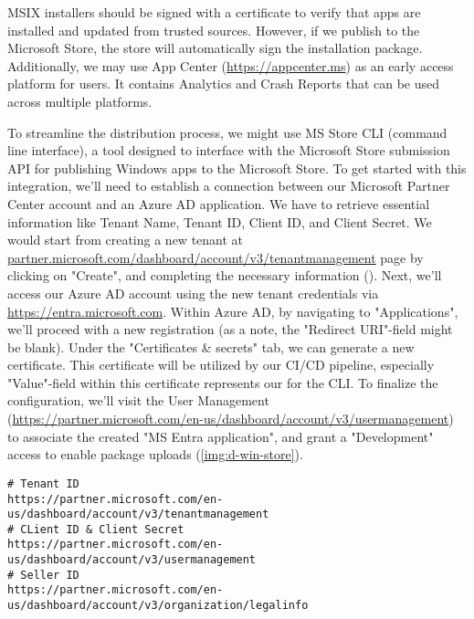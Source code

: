 \noindent MSIX installers should be signed with a certificate to verify that apps are installed and updated from trusted 
sources. However, if we publish to the Microsoft Store, the store will automatically sign the installation package. 
Additionally, we may use App Center (\href{https://appcenter.ms}{https://appcenter.ms}) as an early access platform for 
users. It contains Analytics and Crash Reports that can be used across multiple platforms.

To streamline the distribution process, we might use MS Store CLI (command line interface), a tool designed to 
interface with the Microsoft Store submission API for publishing Windows apps to the Microsoft Store. To get started 
with this integration, we'll need to establish a connection between our Microsoft Partner Center account and an Azure 
AD application. We have to retrieve essential information like Tenant Name, Tenant ID, Client ID, and Client Secret. 
We would start from creating a new tenant at 
\href{https://partner.microsoft.com/en-us/dashboard/account/v3/tenantmanagement}{partner.microsoft.com/dashboard/account/v3/tenantmanagement}
page by clicking on "Create", and completing the necessary information (). Next, we'll access our Azure AD 
account using the new tenant credentials via \href{https://entra.microsoft.com}{https://entra.microsoft.com}. Within 
Azure AD, by navigating to "Applications", we'll proceed with a new registration (as a note, the "Redirect URI"-field 
might be blank). Under the "Certificates \& secrets" tab, we can generate a new certificate. This certificate will be 
utilized by our CI/CD pipeline, especially "Value"-field within this certificate represents our  for 
the CLI. To finalize the configuration, we'll visit the User Management 
(\href{https://partner.microsoft.com/en-us/dashboard/account/v3/usermanagement}{https://partner.microsoft.com/en-us/dashboard/account/v3/usermanagement})
to associate the created "MS Entra application", and grant a "Development" access to enable package uploads 
(\cref{img:d-win-store}).

\begin{lstlisting}[language=terminal]
# Tenant ID  
https://partner.microsoft.com/en-us/dashboard/account/v3/tenantmanagement
# CLient ID & Client Secret
https://partner.microsoft.com/en-us/dashboard/account/v3/usermanagement
# Seller ID 
https://partner.microsoft.com/en-us/dashboard/account/v3/organization/legalinfo
\end{lstlisting}

